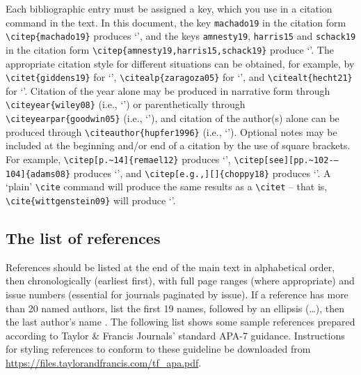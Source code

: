 \documentclass[]{interact}
\theoremstyle{plain}%
\theoremstyle{definition}
\theoremstyle{remark}
\begin{document}
Each bibliographic entry must be assigned a key, which you use in a citation command in the text. In this document, the key \verb"machado19" in the citation form \verb"\citep{machado19}" produces `\citep{machado19}', and the keys \verb"amnesty19", \verb"harris15" and \verb"schack19" in the citation form \verb"\citep{amnesty19,harris15,schack19}" produce `\citep{amnesty19,harris15,schack19}'. The appropriate citation style for different situations can be obtained, for example, by \verb"\citet{giddens19}" for `\citet{giddens19}', \verb"\citealp{zaragoza05}" for `\citealp{zaragoza05}', and \verb"\citealt{hecht21}" for `\citealt{hecht21}'. Citation of the year alone may be produced in narrative form through \verb"\citeyear{wiley08}" (i.e., `\citeyear{wiley08}') or parenthetically through \verb"\citeyearpar{goodwin05}" (i.e., `\citeyearpar{goodwin05}'), and citation of the author(s) alone can be produced through \verb"\citeauthor{hupfer1996}" (i.e., `\citeauthor{hupfer1996}'). Optional notes may be included at the beginning and/or end of a citation by the use of square brackets. For example, \verb"\citep[p.~14]{remael12}" produces `\citep[p.~14]{remael12}', \verb"\citep[see][pp.~102-–104]{adams08}" produces `\citep[see][pp.~102-–104]{adams08}', and \verb"\citep[e.g.,][]{choppy18}" produces `\citep[e.g.,][]{choppy18}'. A `plain' \verb"\cite" command will produce the same results as a \verb"\citet" -- that is, \verb"\cite{wittgenstein09}" will produce `\cite{wittgenstein09}'.


\subsection{The list of references}

References should be listed at the end of the main text in alphabetical order, then chronologically (earliest first), with full page ranges (where appropriate) and issue numbers (essential for journals paginated by issue). If a reference has more than 20 named authors, list the first 19 names, followed by an ellipsis (\ldots), then the last author's name \citep[see][below]{nichols19}.
The following list shows some sample references prepared according to Taylor \& Francis Journals' standard APA-7 guidance. Instructions for styling references to conform to these guideline be downloaded from \url{https://files.taylorandfrancis.com/tf_apa.pdf}.
\end{document}
